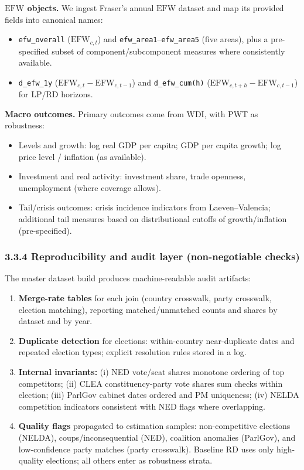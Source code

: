 \documentclass[11pt]{article}
\newcommand{\EFW}{\mathrm{EFW}}
\newcommand{\1}{\mathbf{1}}
\newcommand{\cid}{c}
\begin{document}
\textbf{$\EFW$ objects.}
We ingest Fraser's annual $\EFW$ dataset and map its provided fields into canonical names:
\begin{itemize}[leftmargin=1.2em]
\item \texttt{efw\_overall} ($\EFW_{\cid,t}$) and \texttt{efw\_area1}--\texttt{efw\_area5} (five areas), plus a pre-specified subset of component/subcomponent measures where consistently available.
\item \texttt{d\_efw\_1y} ($\EFW_{\cid,t}-\EFW_{\cid,t-1}$) and \texttt{d\_efw\_cum(h)} ($\EFW_{\cid,t+h}-\EFW_{\cid,t-1}$) for LP/RD horizons.
\end{itemize}

\textbf{Macro outcomes.}
Primary outcomes come from WDI, with PWT as robustness:
\begin{itemize}[leftmargin=1.2em]
\item Levels and growth: log real GDP per capita; GDP per capita growth; log price level / inflation (as available).
\item Investment and real activity: investment share, trade openness, unemployment (where coverage allows).
\item Tail/crisis outcomes: crisis incidence indicators from Laeven--Valencia; additional tail measures based on distributional cutoffs of growth/inflation (pre-specified).
\end{itemize}

\subsubsection*{3.3.4 Reproducibility and audit layer (non-negotiable checks)}
The master dataset build produces machine-readable audit artifacts:
\begin{enumerate}[leftmargin=1.2em]
\item \textbf{Merge-rate tables} for each join (country crosswalk, party crosswalk, election matching), reporting matched/unmatched counts and shares by dataset and by year.
\item \textbf{Duplicate detection} for elections: within-country near-duplicate dates and repeated election types; explicit resolution rules stored in a log.
\item \textbf{Internal invariants:} (i) NED vote/seat shares monotone ordering of top competitors; (ii) CLEA constituency-party vote shares sum checks within election; (iii) ParlGov cabinet dates ordered and PM uniqueness; (iv) NELDA competition indicators consistent with NED flags where overlapping.
\item \textbf{Quality flags} propagated to estimation samples: non-competitive elections (NELDA), coups/inconsequential (NED), coalition anomalies (ParlGov), and low-confidence party matches (party crosswalk). Baseline RD uses only high-quality elections; all others enter as robustness strata.
\end{enumerate}
\end{document}
